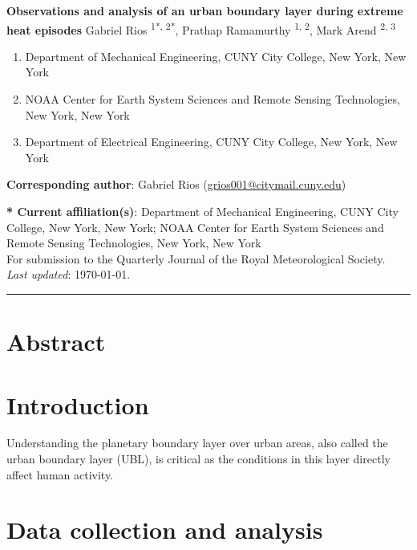 \documentclass[11pt,a4paper]{article}
\begin{document}

\textbf{Observations and analysis of an urban boundary layer during extreme heat episodes}
Gabriel Rios \textsuperscript{1*, 2*}, Prathap Ramamurthy \textsuperscript{1, 2}, Mark Arend \textsuperscript{2, 3}

\small{
\begin{enumerate}[leftmargin=0.5cm, itemsep=0mm]
	\item Department of Mechanical Engineering, CUNY City College, New York, New York
	\item NOAA Center for Earth System Sciences and Remote Sensing Technologies, New York, New York
	\item Department of Electrical Engineering, CUNY City College, New York, New York
\end{enumerate}
}

\textbf{Corresponding author}: Gabriel Rios (\href{mailto:grios001@citymail.cuny.edu}{grios001@citymail.cuny.edu})

\textbf{* Current affiliation(s)}: Department of Mechanical Engineering, CUNY City College, New York, New York; NOAA Center for Earth System Sciences and Remote Sensing Technologies, New York, New York \\

\small{For submission to the Quarterly Journal of the Royal Meteorological Society.} \\
\small{\textit{Last updated}: \today.}

\noindent\rule{\textwidth}{1pt}


\section*{Abstract}


\section{Introduction}
Understanding the planetary boundary layer over urban areas, also called the urban boundary layer (UBL), is critical as the conditions in this layer directly affect human activity.


\section{Data collection and analysis}
\end{document}
